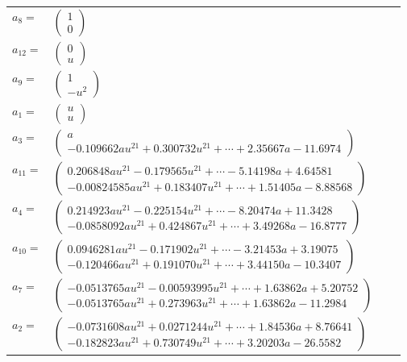 \documentclass[1p]{elsarticle_modified}
\theoremstyle{definition}
\begin{document}
\begin{tabular}{m{7pt} m{180pt} m{7pt} m{180pt} }
\flushright $a_{8}=$&$\begin{pmatrix}1\\0\end{pmatrix}$ \\
\flushright $a_{12}=$&$\begin{pmatrix}0\\u\end{pmatrix}$ \\
\flushright $a_{9}=$&$\begin{pmatrix}1\\- u^2\end{pmatrix}$ \\
\flushright $a_{1}=$&$\begin{pmatrix}u\\u\end{pmatrix}$ \\
\flushright $a_{3}=$&$\begin{pmatrix}a\\-0.109662 a u^{21}+0.300732 u^{21}+\cdots+2.35667 a-11.6974\end{pmatrix}$ \\
\flushright $a_{11}=$&$\begin{pmatrix}0.206848 a u^{21}-0.179565 u^{21}+\cdots-5.14198 a+4.64581\\-0.00824585 a u^{21}+0.183407 u^{21}+\cdots+1.51405 a-8.88568\end{pmatrix}$ \\
\flushright $a_{4}=$&$\begin{pmatrix}0.214923 a u^{21}-0.225154 u^{21}+\cdots-8.20474 a+11.3428\\-0.0858092 a u^{21}+0.424867 u^{21}+\cdots+3.49268 a-16.8777\end{pmatrix}$ \\
\flushright $a_{10}=$&$\begin{pmatrix}0.0946281 a u^{21}-0.171902 u^{21}+\cdots-3.21453 a+3.19075\\-0.120466 a u^{21}+0.191070 u^{21}+\cdots+3.44150 a-10.3407\end{pmatrix}$ \\
\flushright $a_{7}=$&$\begin{pmatrix}-0.0513765 a u^{21}-0.00593995 u^{21}+\cdots+1.63862 a+5.20752\\-0.0513765 a u^{21}+0.273963 u^{21}+\cdots+1.63862 a-11.2984\end{pmatrix}$ \\
\flushright $a_{2}=$&$\begin{pmatrix}-0.0731608 a u^{21}+0.0271244 u^{21}+\cdots+1.84536 a+8.76641\\-0.182823 a u^{21}+0.730749 u^{21}+\cdots+3.20203 a-26.5582\end{pmatrix}$ \\

\end{tabular}
\end{document}
